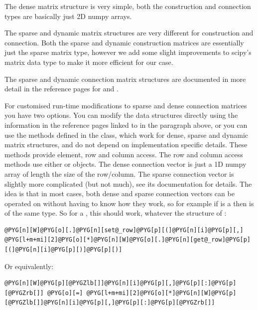 \documentclass[letterpaper,10pt,english]{manual}
\begin{document}
The dense matrix structure is very simple, both the construction and connection
types are basically just 2D numpy arrays.

The sparse and dynamic matrix structures are very different for construction
and connection. Both the sparse and dynamic construction matrices are
essentially just the  sparse matrix type, however we add
some slight improvements to scipy's matrix data type to make it more efficient
for our case.

The sparse and dynamic connection matrix structures are documented in more
detail in the reference pages for \hyperlink{brian.SparseConnectionMatrix}{} and
\hyperlink{brian.DynamicConnectionMatrix}{}.

For customised run-time modifications to sparse and dense connection matrices
you have two options. You can modify the data structures directly using the
information in the reference pages linked to in the paragraph above, or you can
use the methods defined in the \hyperlink{brian.ConnectionMatrix}{} class, which work for
dense, sparse and dynamic matrix structures, and do not depend on implementation
specific details. These methods provide element, row and column access. The
row and column access methods use either \hyperlink{brian.DenseConnectionVector}{}
or \hyperlink{brian.SparseConnectionVector}{} objects. The dense connection vector is just
a 1D numpy array of length the size of the row/column. The sparse connection
vector is slightly more complicated (but not much), see its documentation for
details. The idea is that in most cases, both dense and sparse connection vectors
can be operated on without having to know how they work, so for example if 
is a \hyperlink{brian.ConnectionVector}{} then  is of the same type. So for a
\hyperlink{brian.ConnectionMatrix}{} , this should work, whatever the structure of
:

\begin{Verbatim}[commandchars=@\[\]]
@PYG[n][W]@PYG[o][.]@PYG[n][set@_row]@PYG[p][(]@PYG[n][i]@PYG[p][,] @PYG[l+m+mi][2]@PYG[o][*]@PYG[n][W]@PYG[o][.]@PYG[n][get@_row]@PYG[p][(]@PYG[n][i]@PYG[p][)]@PYG[p][)]
\end{Verbatim}

Or equivalently:

\begin{Verbatim}[commandchars=@\[\]]
@PYG[n][W]@PYG[p][@PYGZlb[]]@PYG[n][i]@PYG[p][,]@PYG[p][:]@PYG[p][@PYGZrb[]] @PYG[o][=] @PYG[l+m+mi][2]@PYG[o][*]@PYG[n][W]@PYG[p][@PYGZlb[]]@PYG[n][i]@PYG[p][,]@PYG[p][:]@PYG[p][@PYGZrb[]]
\end{Verbatim}
\end{document}
